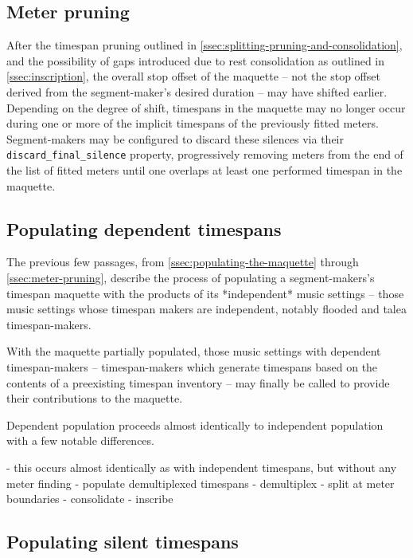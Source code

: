 \subsection{Meter pruning}
\label{ssec:meter-pruning}

After the timespan pruning outlined in
\autoref{ssec:splitting-pruning-and-consolidation}, and the possibility of gaps
introduced due to rest consolidation as outlined in \autoref{ssec:inscription},
the overall stop offset of the maquette -- not the stop offset derived from the
segment-maker's desired duration -- may have shifted earlier. Depending on the
degree of shift, timespans in the maquette may no longer occur during one or
more of the implicit timespans of the previously fitted meters. Segment-makers
may be configured to discard these silences via their
\texttt{discard\_final\_silence} property, progressively removing meters from
the end of the list of fitted meters until one overlaps at least one performed
timespan in the maquette.

\subsection{Populating dependent timespans}
\label{ssec:populating-dependent-timespans}

The previous few passages, from \autoref{ssec:populating-the-maquette} through
\autoref*{ssec:meter-pruning}, describe the process of populating a
segment-makers's timespan maquette with the products of its *independent* music
settings -- those music settings whose timespan makers are independent, notably
flooded and talea timespan-makers.

With the maquette partially populated, those music settings with dependent
timespan-makers -- timespan-makers which generate timespans based on the
contents of a preexisting timespan inventory -- may finally be called to
provide their contributions to the maquette.

Dependent population proceeds almost identically to independent population with
a few notable differences.

\begin{markdown}
-   this occurs almost identically as with independent timespans,
    but without any meter finding
-   populate demultiplexed timespans
-   demultiplex
-   split at meter boundaries
-   consolidate
-   inscribe
\end{markdown}

\subsection{Populating silent timespans}
\label{ssec:populating-silent-timespans}

